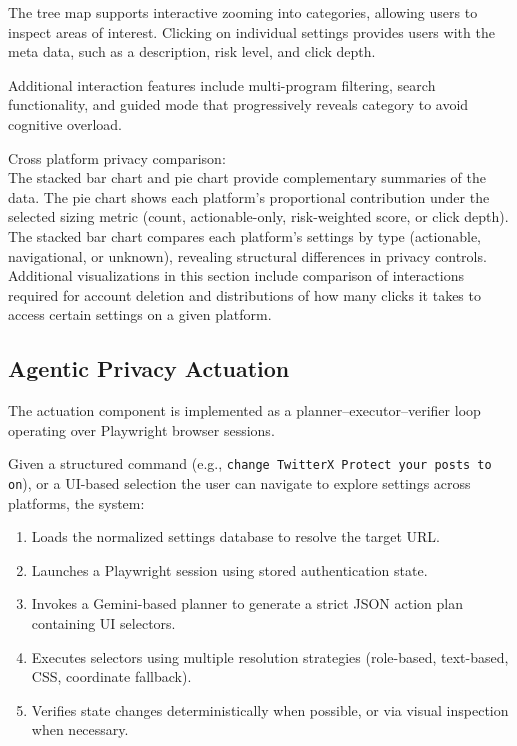 \documentclass[12pt,letterpaper]{article}
\begin{document}
    The tree map supports interactive zooming into categories, allowing users to inspect areas of interest. Clicking on individual settings provides users with the meta data, such as a description, risk level, and click depth. 

    Additional interaction features include multi-program filtering, search functionality, and guided mode that progressively reveals category to avoid cognitive overload.

    Cross platform privacy comparison:\\
    The stacked bar chart and pie chart provide complementary summaries of the data. The pie chart shows each platform's proportional contribution under the selected sizing metric (count, actionable-only, risk-weighted score, or click depth). The stacked bar chart compares each platform's settings by type (actionable, navigational, or unknown), revealing structural differences in privacy controls. Additional visualizations in this section include comparison of interactions required for account deletion and distributions of how many clicks it takes to access certain settings on a given platform.

    
    
    \subsection{Agentic Privacy Actuation}
    
    The actuation component is implemented as a planner–executor–verifier loop operating over Playwright browser sessions.
    
    Given a structured command (e.g., \texttt{change TwitterX Protect your posts to on}), or a UI-based selection the user can navigate to explore settings across platforms, the system:
    
    \begin{enumerate}
        \item Loads the normalized settings database to resolve the target URL.
        \item Launches a Playwright session using stored authentication state.
        \item Invokes a Gemini-based planner to generate a strict JSON action plan containing UI selectors.
        \item Executes selectors using multiple resolution strategies (role-based, text-based, CSS, coordinate fallback).
        \item Verifies state changes deterministically when possible, or via visual inspection when necessary.
    \end{enumerate}
    
\end{document}
